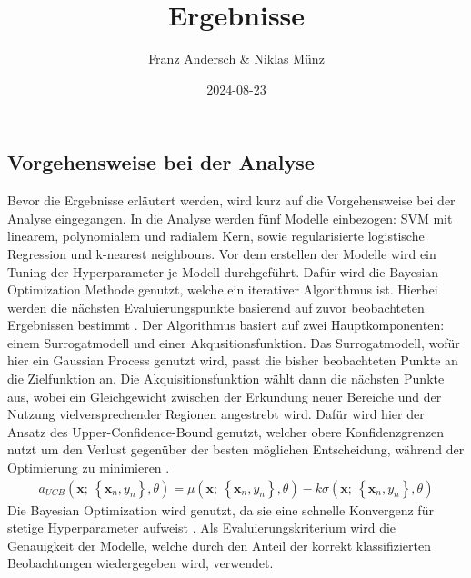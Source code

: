 \documentclass[
]{article}
\title{Ergebnisse}
\author{Franz Andersch \& Niklas Münz}
\date{2024-08-23}
\renewcommand{\maketitle}{}
\begin{document}
\maketitle

\subsection{Vorgehensweise bei der Analyse}

Bevor die Ergebnisse erläutert werden, wird kurz auf die Vorgehensweise
bei der Analyse eingegangen. In die Analyse werden fünf Modelle
einbezogen: SVM mit linearem, polynomialem und radialem Kern, sowie
regularisierte logistische Regression und k-nearest neighbours.\newline
Vor dem erstellen der Modelle wird ein Tuning der Hyperparameter je
Modell durchgeführt. Dafür wird die Bayesian Optimization Methode
genutzt, welche ein iterativer Algorithmus ist. Hierbei werden die
nächsten Evaluierungspunkte basierend auf zuvor beobachteten Ergebnissen
bestimmt \parencite{yangHyperparameterOptimizationMachine2020}. Der
Algorithmus basiert auf zwei Hauptkomponenten: einem Surrogatmodell und
einer Akqusitionsfunktion. Das Surrogatmodell, wofür hier ein Gaussian
Process genutzt wird, passt die bisher beobachteten Punkte an die
Zielfunktion an. Die Akquisitionsfunktion wählt dann die nächsten Punkte
aus, wobei ein Gleichgewicht zwischen der Erkundung neuer Bereiche und
der Nutzung vielversprechender Regionen angestrebt wird. Dafür wird hier
der Ansatz des Upper-Confidence-Bound genutzt, welcher obere
Konfidenzgrenzen nutzt um den Verlust gegenüber der besten möglichen
Entscheidung, während der Optimierung zu minimieren
\parencite{snoekPracticalBayesianOptimization2012}. \begin{align}
a_{UCB}(\mathbf{x};~\left\{\mathbf{x}_n,y_n\right\},\theta) = \mu(\mathbf{x};~\left\{\mathbf{x}_n,y_n\right\},\theta) - k \sigma(\mathbf{x};~\left\{\mathbf{x}_n,y_n\right\},\theta)
\end{align} Die Bayesian Optimization wird genutzt, da sie eine schnelle
Konvergenz für stetige Hyperparameter aufweist
\parencite{yangHyperparameterOptimizationMachine2020}. Als
Evaluierungskriterium wird die Genauigkeit der Modelle, welche durch den
Anteil der korrekt klassifizierten Beobachtungen wiedergegeben wird,
verwendet.
\end{document}
